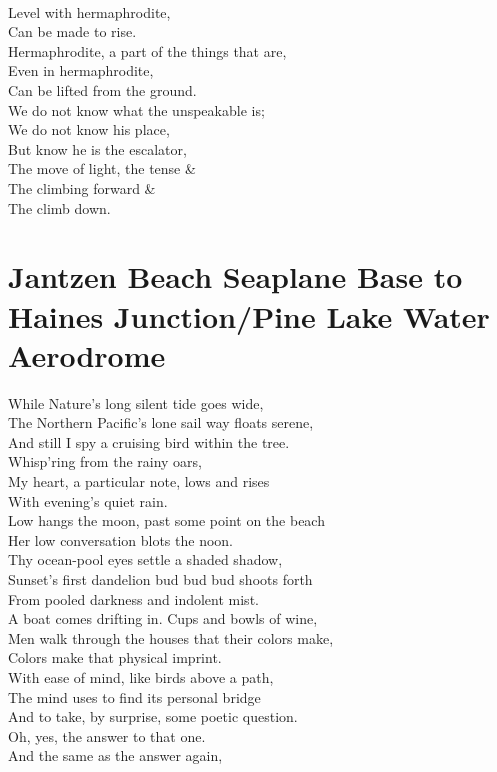 \documentclass[smalldemyvopaper,11pt,twoside,onecolumn,openright,extrafontsizes]{memoir}
\begin{document}
\\Level with hermaphrodite,
\\Can be made to rise.
\\Hermaphrodite, a part of the things that are,
\\Even in hermaphrodite,
\\Can be lifted from the ground.
\\We do not know what the unspeakable is;
\\We do not know his place,
\\But know he is the escalator,
\\The move of light, the tense \&
\\The climbing forward \&
\\The climb down.



\chapter{Jantzen Beach Seaplane Base to Haines Junction/Pine Lake Water Aerodrome}
While Nature's long silent tide goes wide,
\\The Northern Pacific's lone sail way floats serene,
\\And still I spy a cruising bird within the tree.
\\Whisp'ring from the rainy oars,
\\My heart, a particular note, lows and rises
\\With evening's quiet rain.
\\Low hangs the moon, past some point on the beach
\\Her low conversation blots the noon.
\\Thy ocean-pool eyes settle a shaded shadow,
\\Sunset's first dandelion bud bud bud shoots forth
\\From pooled darkness and indolent mist.
\\A boat comes drifting in. Cups and bowls of wine,
\\Men walk through the houses that their colors make,
\\Colors make that physical imprint.
\\With ease of mind, like birds above a path,
\\The mind uses to find its personal bridge
\\And to take, by surprise, some poetic question.
\\Oh, yes, the answer to that one.
\\And the same as the answer again,
\end{document}
